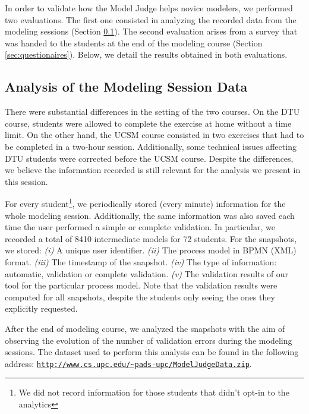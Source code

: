 In order to validate how the Model Judge helps novice modelers, we performed two evaluations.  The first one consisted in analyzing the recorded data from the modeling sessions (Section \ref{sec:data_analysis}). The second evaluation arises from a survey that was handed to the students at the end of the modeling course (Section \ref{sec:questionaires}). Below, we detail the results obtained in both evaluations.

\subsection{Analysis of the Modeling Session Data}
\label{sec:data_analysis}
There were substantial differences in the setting of the two courses. On the DTU course, students were allowed to complete the exercise at home without a time limit. On the other hand, the UCSM course consisted in two exercises that had to be completed in a two-hour session. %
Additionally, some technical issues affecting DTU students were corrected before the UCSM course. Despite the differences, we believe the information recorded is still relevant for the analysis we present in this session. 

For every student\footnote{We did not record information for those students that
  didn't opt-in to the analytics}, we periodically stored (every minute)
information for the whole modeling session. Additionally, the same information
was also saved each time the user performed a simple or complete validation. In
particular, we recorded a total of 8410 intermediate models for 72 students. For
the snapshots, we stored: \textit{(i)} A unique user identifier. \textit{(ii)}
The process model in BPMN (XML) format. \textit{(iii)} The timestamp of the
snapshot. \textit{(iv)} The type of information: automatic, validation or
complete validation. \textit{(v)} The validation results of our tool for the
particular process model. Note that the validation results were computed for all
snapshots, despite the students only seeing the ones they explicitly requested.

After the end of modeling course, we analyzed the snapshots with the aim of
observing the evolution of the number of validation errors during the modeling
sessions. The dataset used to perform this analysis can be found in the
following address:
\texttt{\url{http://www.cs.upc.edu/~pads-upc/ModelJudgeData.zip}}.

